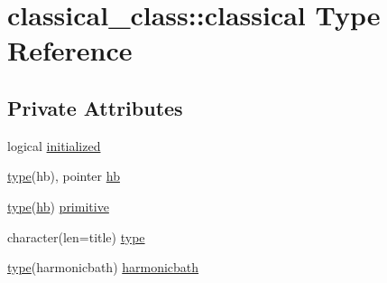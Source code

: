 \hypertarget{structclassical__class_1_1classical}{\section{classical\+\_\+class\+:\+:classical Type Reference}
\label{structclassical__class_1_1classical}
}
\subsection*{Private Attributes}
\begin{DoxyCompactItemize}
\item 
logical \hyperlink{structclassical__class_1_1classical_a5f61e82b2e7ad767b39cea9512cd1e79}{initialized}
\item 
\hyperlink{structclassical__class_1_1classical_a4c835c43f9359c512790ebce83387d63}{type}(hb), pointer \hyperlink{structclassical__class_1_1classical_a1b460aa0f46813107d5d6b2c6904b714}{hb}
\item 
\hyperlink{structclassical__class_1_1classical_a4c835c43f9359c512790ebce83387d63}{type}(\hyperlink{structclassical__class_1_1classical_a1b460aa0f46813107d5d6b2c6904b714}{hb}) \hyperlink{structclassical__class_1_1classical_ae02517eaafa051141de41d949d7be0ef}{primitive}
\item 
character(len=title) \hyperlink{structclassical__class_1_1classical_a4c835c43f9359c512790ebce83387d63}{type}
\item 
\hyperlink{structclassical__class_1_1classical_a4c835c43f9359c512790ebce83387d63}{type}(harmonicbath) \hyperlink{structclassical__class_1_1classical_a36ea44d91c4d0b5dd920ba9099be4ceb}{harmonicbath}
\end{DoxyCompactItemize}


